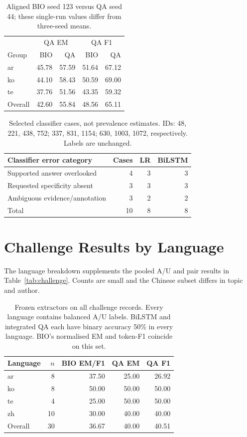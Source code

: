 \documentclass[11pt]{article}
\begin{document}
\begin{table}[H]
\centering\small\setlength{\tabcolsep}{4pt}
\begin{tabular}{lrrrr}
\toprule
 & \multicolumn{2}{c}{QA EM} & \multicolumn{2}{c}{QA F1}\\
Group & BIO & QA & BIO & QA\\
\midrule
ar & 45.78 & 57.59 & 51.64 & 67.12\\
ko & 44.10 & 58.43 & 50.59 & 69.00\\
te & 37.76 & 51.56 & 43.35 & 59.32\\
Overall & 42.60 & 55.84 & 48.56 & 65.11\\
\bottomrule
\end{tabular}
\caption{Aligned BIO seed 123 versus QA seed 44; these single-run values differ from three-seed means.}
\end{table}

\begin{table}[H]
\centering\small\setlength{\tabcolsep}{3pt}
\begin{tabular}{p{3.6cm}rrr}
\toprule
Classifier error category & Cases & LR & BiLSTM\\
\midrule
Supported answer overlooked & 4 & 3 & 3\\
Requested specificity absent & 3 & 3 & 3\\
Ambiguous evidence/annotation & 3 & 2 & 2\\
\midrule
Total & 10 & 8 & 8\\
\bottomrule
\end{tabular}
\caption{Selected classifier cases, not prevalence estimates. IDs: 48, 221, 438, 752; 337, 831, 1154; 630, 1003, 1072, respectively. Labels are unchanged.}
\end{table}

\section{Challenge Results by Language}
\label{app:challenge}
The language breakdown supplements the pooled A/U and pair results in Table~\ref{tab:challenge}. Counts are small and the Chinese subset differs in topic and author.
\begin{table}[H]
\centering\small\setlength{\tabcolsep}{4pt}
\begin{tabular}{lrrrr}
\toprule
Language & $n$ & BIO EM/F1 & QA EM & QA F1\\
\midrule
ar & 8 & 37.50 & 25.00 & 26.92\\
ko & 8 & 50.00 & 50.00 & 50.00\\
te & 4 & 25.00 & 50.00 & 50.00\\
zh & 10 & 30.00 & 40.00 & 40.00\\
Overall & 30 & 36.67 & 40.00 & 40.51\\
\bottomrule
\end{tabular}
\caption{Frozen extractors on all challenge records. Every language contains balanced A/U labels. BiLSTM and integrated QA each have binary accuracy 50\% in every language. BIO's normalised EM and token-F1 coincide on this set.}
\end{table}
\end{document}
